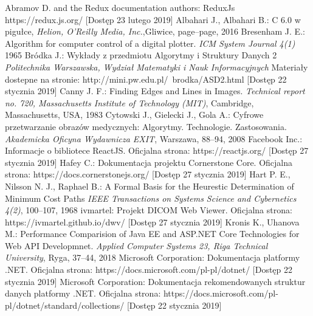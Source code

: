 \documentclass[a4paper,11pt,twoside,openright]{report}
\theoremstyle{definition}
\begin{document}
\begin{thebibliography}{24}%
{}


 Abramov D. and the Redux documentation authors: ReduxJs https://redux.js.org/ [Dostęp 23 lutego 2019]
 Albahari J., Albahari B.: C 6.0 w pigułce, \emph{Helion, O'Reilly Media, Inc.},Gliwice, page--page, 2016
 Bresenham J. E.: Algorithm for computer control of a digital plotter. \emph{ICM System Journal 4(1)} 1965
 Bródka J.: Wykłady z przedmiotu Algorytmy i Struktury Danych 2 \emph{Politechnika Warszawska, Wydział Matematyki i Nauk Informacyjnych} Materiały dostepne na stronie: http://mini.pw.edu.pl/~brodka/ASD2.html [Dostęp 22 stycznia 2019]
 Canny J. F.: Finding Edges and Lines in Images. \emph{Technical report no. 720, Massachusetts Institute of Technology (MIT)}, Cambridge, Massachusetts, USA, 1983
 Cytowski J., Gielecki J., Gola A.: Cyfrowe przetwarzanie obrazów medycznych: Algorytmy. Technologie. Zastosowania. \emph{Akademicka Oficyna Wydawnicza EXIT}, Warszawa, 88--94, 2008
 Facebook Inc.: Informacje o bibliotece ReactJS. Oficjalna strona: https://reactjs.org/ [Dostęp 27 stycznia 2019]
  Hafey C.: Dokumentacja projektu Cornerstone Core. Oficjalna strona: https://docs.cornerstonejs.org/ [Dostęp 27 stycznia 2019]
 Hart P. E., Nilsson N. J., Raphael B.: A Formal Basis for the Heurestic Determination of Minimum Cost Paths \emph{IEEE Transactions on Systems Science and Cybernetics 4(2)}, 100--107, 1968
  ivmartel: Projekt DICOM Web Viewer. Oficjalna strona: https://ivmartel.github.io/dwv/ [Dostęp 27 stycznia 2019]
 Kronis K., Uhanova M.: Performance Comparision of Java EE and ASP.NET Core Technologies for Web API Developmnet. \emph{Applied Computer Systems 23, Riga Technical University}, Ryga, 37--44, 2018
 Microsoft Corporation: Dokumentacja platformy .NET. Oficjalna strona: https://docs.microsoft.com/pl-pl/dotnet/ [Dostęp 22 stycznia 2019]
 Microsoft Corporation: Dokumentacja rekomendowanych struktur danych platformy .NET. Oficjalna strona: https://docs.microsoft.com/pl-pl/dotnet/standard/collections/ [Dostęp 22 stycznia 2019]

\end{thebibliography}
\end{document}
